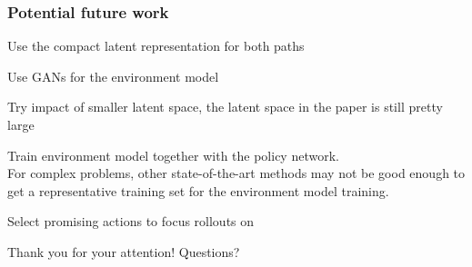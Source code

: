 \begin{frame}
	\frametitle{Potential future work}
	\begin{PraesentationAufzaehlung}
		\item Use the compact latent representation for both paths
	\item Use GANs for the environment model
	\item Try impact of smaller latent space, the latent space in the paper is still pretty large
	
	\item Train environment model together with the policy network.\\
	For complex problems, other state-of-the-art methods may not be good enough to get a representative training set for the environment model training.
	\item Select promising actions to focus rollouts on
	\end{PraesentationAufzaehlung}
\end{frame}


\begin{frame}
	\vspace*{\fill}
	\huge
	\begingroup
	\centering
	Thank you for your attention!
	\endgroup
	\bigskip
	\begingroup
	\centering
	Questions?
	\endgroup
	\normalsize
	\vspace*{\fill}
\end{frame}
